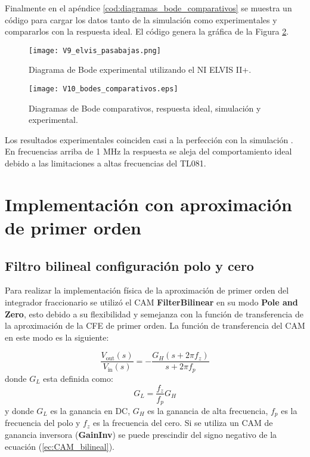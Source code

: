 	Finalmente en el apéndice \ref{cod:diagramas_bode_comparativos} se muestra un código para cargar los datos tanto de la simulación como experimentales y compararlos con la respuesta ideal. El código genera la gráfica de la Figura \ref{fig:V10_bodes_comparativos}. 
	
	\begin{figure}[h!]
		\caption{Diagrama de Bode experimental utilizando el NI ELVIS II+.}
		\label{fig:V9_elvis_pasabajas}
		\centering
		\texttt{[image: V9\_elvis\_pasabajas.png]}
	\end{figure}
	
	\begin{figure}[h!]
		\caption{Diagramas de Bode comparativos, respuesta ideal, simulación y experimental.}
		\label{fig:V10_bodes_comparativos}
		\centering
		\texttt{[image: V10\_bodes\_comparativos.eps]}
	\end{figure}
	Los resultados experimentales coinciden casi a la perfección con la simulación . En frecuencias arriba de 1 MHz la respuesta se aleja del comportamiento ideal debido a las limitaciones a altas frecuencias del TL081.
	
	\section{Implementación con aproximación de primer orden}
	
		\subsection{Filtro bilineal configuración polo y cero}
	
	Para realizar la implementación física de la aproximación de primer orden del integrador fraccionario se utilizó el CAM \textbf{FilterBilinear} en su modo \textbf{Pole and Zero}, esto debido a su flexibilidad y semejanza con la función de transferencia de la aproximación de la CFE de primer orden. La función de transferencia del CAM en este modo es la siguiente:
	
	\begin{equation}
		\frac{V_{\mathrm{out}} (s)}{V_{\mathrm{in}}(s)} = -\frac{G_{H} (s + 2 \pi f_{z})}{s + 2 \pi f_{p}}
		\label{ec:CAM_bilineal}
	\end{equation}
	donde $G_{L}$ esta definida como:
	\begin{equation}
		G_{L} = \frac{f_{z}}{f_{p}} G_{H}
	\end{equation}
	y donde $G_{L}$ es la ganancia en DC, $G_{H}$ es la ganancia de alta frecuencia, $f_{p}$ es la frecuencia del polo y $f_{z}$ es la frecuencia del cero. Si se utiliza un CAM de ganancia inversora (\textbf{GainInv}) se puede prescindir del signo negativo de la ecuación (\ref{ec:CAM_bilineal}).
	
